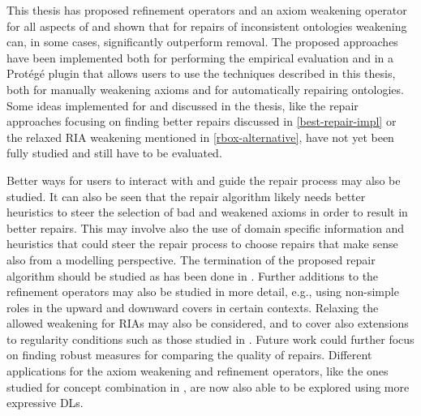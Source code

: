 
This thesis has proposed refinement operators and an axiom weakening operator for all aspects of \SROIQ and shown that for repairs of inconsistent ontologies weakening can, in some cases, significantly outperform removal. The proposed approaches have been implemented both for performing the empirical evaluation and in a Protégé plugin that allows users to use the techniques described in this thesis, both for manually weakening axioms and for automatically repairing ontologies. Some ideas implemented for and discussed in the thesis, like the repair approaches focusing on finding better repairs discussed in \cref{best-repair-impl} or the relaxed RIA weakening mentioned in \cref{rbox-alternative}, have not yet been fully studied and still have to be evaluated.

Better ways for users to interact with and guide the repair process may also be studied. It can also be seen that the repair algorithm likely needs better heuristics to steer the selection of bad and weakened axioms in order to result in better repairs. This may involve also the use of domain specific information and heuristics that could steer the repair process to choose repairs that make sense also from a modelling perspective. The termination of the proposed repair algorithm should be studied as has been done in \cite{confalonieri2020towards}. Further additions to the refinement operators may also be studied in more detail, e.g., using non-simple roles in the upward and downward covers in certain contexts. Relaxing the allowed weakening for RIAs may also be considered, and to cover also extensions to regularity conditions such as those studied in \cite{DBLP:conf/cade/Kazakov10}. Future work could further focus on finding robust measures for comparing the quality of repairs. Different applications for the axiom weakening and refinement operators, like the ones studied for concept combination in \cite{righetti2022asymmetric}, are now also able to be explored using more expressive DLs.

